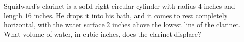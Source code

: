 Squidward's clarinet is a solid right circular cylinder with radius $4$ inches and length $16$ inches. He drops it into his bath, and it comes to rest completely horizontal, with the water surface $2$ inches above the lowest line of the clarinet. What volume of water, in cubic inches, does the clarinet displace?
